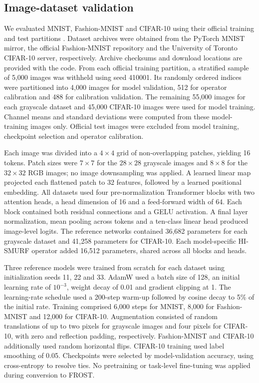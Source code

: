 \subsection{Image-dataset validation}
\label{methods:image_validation}

We evaluated MNIST, Fashion-MNIST and CIFAR-10 using their official training
and test partitions \cite{lecun1998gradient,xiao2017fashion,krizhevsky2009learning}.
Dataset archives were obtained from the PyTorch MNIST mirror, the official
Fashion-MNIST repository and the University of Toronto CIFAR-10 server,
respectively. Archive checksums and download locations are provided with the
code. From each official training partition, a stratified sample of 5,000
images was withheld using seed 410001. Its randomly ordered indices were
partitioned into 4,000 images for model validation, 512 for operator
calibration and 488 for calibration validation. The remaining 55,000 images
for each grayscale dataset and 45,000 CIFAR-10 images were used for model
training. Channel means and standard deviations were computed from these
model-training images only. Official test images were excluded from model
training, checkpoint selection and operator calibration.

Each image was divided into a $4\times4$ grid of non-overlapping patches,
yielding 16 tokens. Patch sizes were $7\times7$ for the $28\times28$
grayscale images and $8\times8$ for the $32\times32$ RGB images; no image
downsampling was applied. A learned linear map projected each flattened
patch to 32 features, followed by a learned positional embedding. All
datasets used four pre-normalization Transformer blocks with two attention
heads, a head dimension of 16 and a feed-forward width of 64. Each block
contained both residual connections and a GELU activation. A final layer
normalization, mean pooling across tokens and a ten-class linear head
produced image-level logits. The reference networks contained 36,682
parameters for each grayscale dataset and 41,258 parameters for CIFAR-10.
Each model-specific HI-SMURF operator added 16,512 parameters, shared across
all blocks and heads.

Three reference models were trained from scratch for each dataset using
initialization seeds 11, 22 and 33. AdamW used a batch size of 128, an initial
learning rate of $10^{-3}$, weight decay of 0.01 and gradient clipping at
1. The learning-rate schedule used a 200-step warm-up followed by cosine
decay to 5\% of the initial rate. Training comprised 6,000 steps for MNIST,
8,000 for Fashion-MNIST and 12,000 for CIFAR-10. Augmentation consisted of
random translations of up to two pixels for grayscale images and four
pixels for CIFAR-10, with zero and reflection padding, respectively.
Fashion-MNIST and CIFAR-10 additionally used random horizontal flips.
CIFAR-10 training used label smoothing of 0.05. Checkpoints were selected
by model-validation accuracy, using cross-entropy to resolve ties. No
pretraining or task-level fine-tuning was applied during conversion to FROST.

